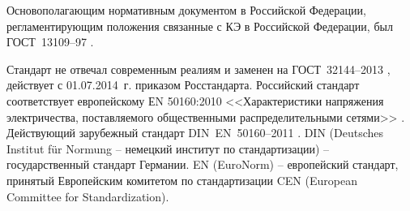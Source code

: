 





Основополагающим нормативным документом в Российской Федерации, регламентирующим положения связанные с КЭ в Российской Федерации, был ГОСТ~13109--97 \cite{GOST13109-97}. 

Стандарт не отвечал современным реалиям и заменен на ГОСТ~32144--2013 \cite{GOST32144-2013}, действует с 01.07.2014~г. приказом Росстандарта. Российский стандарт соответствует европейскому ЕN 50160:2010 <<Характеристики напряжения электричества, поставляемого общественными распределительными сетями>> \cite{ЕN50160:2010}. Действующий зарубежный стандарт DIN~EN~50160--2011 \cite{DINEN50160-2011}. DIN (Deutsches Institut für Normung – немецкий институт по стандартизации) – государственный стандарт Германии. EN (EuroNorm) – европейский стандарт, принятый Европейским комитетом по стандартизации CEN (European Committee for Standardization).

